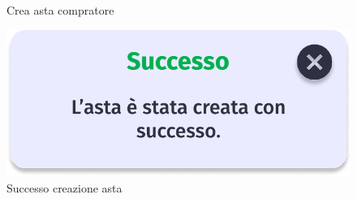 \begin{figure}[!htb]
\begin{minipage}{0.32\textwidth}
                \caption{Crea asta compratore}
            \end{minipage}\hfill
            \begin{minipage}{0.32\textwidth}
                \centering
                \includegraphics[width=.7\linewidth]{Immagini/Frames/Popup/P20.pdf}
                \caption{Successo creazione asta}
            \end{minipage}\hfill
        \end{figure}
    
